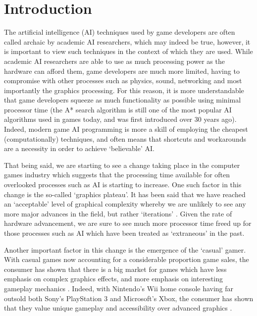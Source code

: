 \documentclass[a4paper,oneside]{report}
\begin{document}
%
%

\chapter{Introduction}

The artificial intelligence (AI) techniques used by game developers are often called archaic by academic AI researchers, which may indeed be true, however, it is important to view such techniques in the context of which they are used. While academic AI researchers are able to use as much processing power as the hardware can afford them, game developers are much more limited, having to compromise with other processes such as physics, sound, networking and most importantly the graphics processing. For this reason, it is more understandable that game developers squeeze as much functionality as possible using minimal processor time (the A* search algorithm is still one of the most popular AI algorithms used in games today, and was first introduced over 30 years ago). Indeed, modern game AI programming is more a skill of employing the cheapest (computationally) techniques, and often means that shortcuts and workarounds are a necessity in order to achieve `believable' AI. 

That being said, we are starting to see a change taking place in the computer games industry which suggests that the processing time available for often overlooked processes such as AI is starting to increase. One such factor in this change is the so-called `graphics plateau'. It has been said that we have reached an `acceptable' level of graphical complexity whereby we are unlikely to see any more major advances in the field, but rather `iterations' \cite{Sheffield:2008fk}. Given the rate of hardware advancement, we are sure to see much more processor time freed up for those processes such as AI which have been treated as `extraneous' in the past. 

Another important factor in this change is the emergence of the `casual' gamer. With casual games now accounting for a considerable proportion game sales, the consumer has shown that there is a big market for games which have less emphasis on complex graphics effects, and more emphasis on interesting gameplay mechanics \cite{Association:2011uq}. Indeed, with Nintendo's Wii home console having far outsold both Sony's PlayStation 3 and Microsoft's Xbox, the consumer has shown that they value unique gameplay and accessibility over advanced graphics \cite{:2012dq, Nintendo:2012nx, :cr}. 
\end{document}
